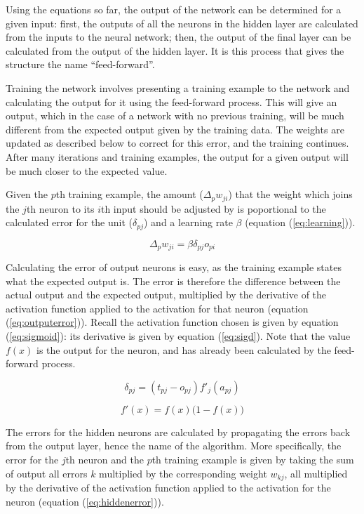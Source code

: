Using the equations so far, the output of the network can be determined for a given input: first, the outputs of all the neurons in the hidden layer are calculated from the inputs to the neural network; then, the output of the final layer can be calculated from the output of the hidden layer.  It is this process that gives the structure the name ``feed-forward''.

Training the network involves presenting a training example to the network and calculating the output for it using the feed-forward process.  This will give an output, which in the case of a network with no previous training, will be much different from the expected output given by the training data.  The weights are updated as described below to correct for this error, and the training continues.  After many iterations and training examples, the output for a given output will be much closer to the expected value.

Given the $p$th training example, the amount ($\Delta_{p}w_{ji}$) that the weight which joins the $j$th neuron to its $i$th input should be adjusted by is poportional to the calculated error for the unit ($\delta_{pj}$) and a learning rate $\beta$ (equation (\ref{eq:learning})).

\begin{equation}
\Delta_pw_{ji} = \beta\delta_{pj}o_{pi}
\label{eq:learning}
\end{equation}

Calculating the error of output neurons is easy, as the training example states what the expected output is.  The error is therefore the difference between the actual output and the expected output, multiplied by the derivative of the activation function applied to the activation for that neuron (equation (\ref{eq:outputerror})).  Recall the activation function chosen is given by equation (\ref{eq:sigmoid}): its derivative is given by equation (\ref{eq:sigd}).  Note that the value $f(x)$ is the output for the neuron, and has already been calculated by the feed-forward process.

\begin{equation}
\delta_{pj} = (t_{pj} - o_{pj})f'_j(a_{pj})
\label{eq:outputerror}
\end{equation}

\begin{equation}
f'(x) = f(x)\big(1 - f(x)\big)
\label{eq:sigd}
\end{equation}

The errors for the hidden neurons are calculated by propagating the errors back from the output layer, hence the name of the algorithm.  More specifically, the error for the $j$th neuron and the $p$th training example is given by taking the sum of output all errors $k$ multiplied by the corresponding weight $w_{kj}$, all multiplied by the derivative of the activation function applied to the activation for the neuron (equation (\ref{eq:hiddenerror})).

